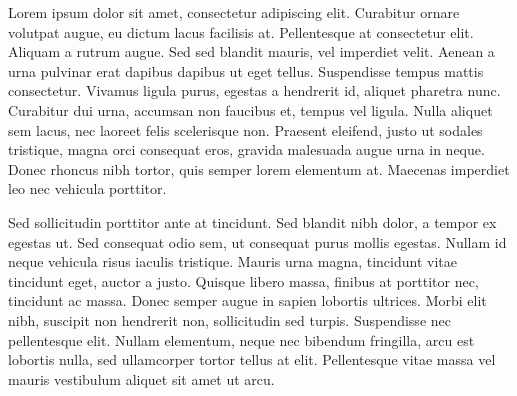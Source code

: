 Lorem ipsum dolor sit amet, consectetur adipiscing elit. Curabitur ornare volutpat augue, eu dictum lacus facilisis at. Pellentesque at consectetur elit. Aliquam a rutrum augue. Sed sed blandit mauris, vel imperdiet velit. Aenean a urna pulvinar erat dapibus dapibus ut eget tellus. Suspendisse tempus mattis consectetur. Vivamus ligula purus, egestas a hendrerit id, aliquet pharetra nunc. Curabitur dui urna, accumsan non faucibus et, tempus vel ligula. Nulla aliquet sem lacus, nec laoreet felis scelerisque non. Praesent eleifend, justo ut sodales tristique, magna orci consequat eros, gravida malesuada augue urna in neque. Donec rhoncus nibh tortor, quis semper lorem elementum at. Maecenas imperdiet leo nec vehicula porttitor.

   

Sed sollicitudin porttitor ante at tincidunt. Sed blandit nibh dolor, a tempor ex egestas ut. Sed consequat odio sem, ut consequat purus mollis egestas. Nullam id neque vehicula risus iaculis tristique. Mauris urna magna, tincidunt vitae tincidunt eget, auctor a justo. Quisque libero massa, finibus at porttitor nec, tincidunt ac massa. Donec semper augue in sapien lobortis ultrices. Morbi elit nibh, suscipit non hendrerit non, sollicitudin sed turpis. Suspendisse nec pellentesque elit. Nullam elementum, neque nec bibendum fringilla, arcu est lobortis nulla, sed ullamcorper tortor tellus at elit. Pellentesque vitae massa vel mauris vestibulum aliquet sit amet ut arcu.